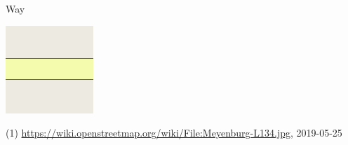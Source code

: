 \documentclass{beamer}
\begin{document}
\begin{frame}{Way}
\begin{center}
\begin{minipage}[b][0.6\textheight][c]{0.3\linewidth}
\begin{center}
					\includegraphics[width=0.3\linewidth,height=0.3\textheight,keepaspectratio]{images/Rendering-highway_secondary_neutral.png}\\
					\vspace{0.25cm}
				\end{center}
			\end{minipage}
		\end{center}
		{\tiny (1) \url{https://wiki.openstreetmap.org/wiki/File:Meyenburg-L134.jpg}, 2019-05-25}
	\end{frame}
	
\end{document}
